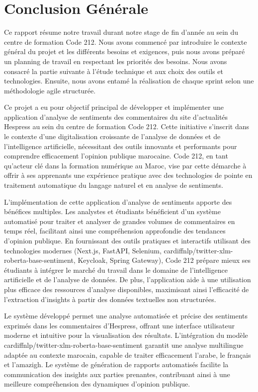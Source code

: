 \chapter*{Conclusion Générale}

Ce rapport résume notre travail durant notre stage de fin d'année au sein du centre de formation Code 212. Nous avons commencé par introduire le contexte général du projet et les différents besoins et exigences, puis nous avons préparé un planning de travail en respectant les priorités des besoins. Nous avons consacré la partie suivante à l'étude technique et aux choix des outils et technologies. Ensuite, nous avons entamé la réalisation de chaque sprint selon une méthodologie agile structurée.

Ce projet a eu pour objectif principal de développer et implémenter une application d'analyse de sentiments des commentaires du site d'actualités Hespress au sein du centre de formation Code 212. Cette initiative s'inscrit dans le contexte d'une digitalisation croissante de l'analyse de données et de l'intelligence artificielle, nécessitant des outils innovants et performants pour comprendre efficacement l'opinion publique marocaine. Code 212, en tant qu'acteur clé dans la formation numérique au Maroc, vise par cette démarche à offrir à ses apprenants une expérience pratique avec des technologies de pointe en traitement automatique du langage naturel et en analyse de sentiments.

L'implémentation de cette application d'analyse de sentiments apporte des bénéfices multiples. Les analystes et étudiants bénéficient d'un système automatisé pour traiter et analyser de grandes volumes de commentaires en temps réel, facilitant ainsi une compréhension approfondie des tendances d'opinion publique. En fournissant des outils pratiques et interactifs utilisant des technologies modernes (Next.js, FastAPI, Selenium, cardiffnlp/twitter-xlm-roberta-base-sentiment, Keycloak, Spring Gateway), Code 212 prépare mieux ses étudiants à intégrer le marché du travail dans le domaine de l'intelligence artificielle et de l'analyse de données. De plus, l'application aide à une utilisation plus efficace des ressources d'analyse disponibles, maximisant ainsi l'efficacité de l'extraction d'insights à partir des données textuelles non structurées.

Le système développé permet une analyse automatisée et précise des sentiments exprimés dans les commentaires d'Hespress, offrant une interface utilisateur moderne et intuitive pour la visualisation des résultats. L'intégration du modèle cardiffnlp/twitter-xlm-roberta-base-sentiment garantit une analyse multilingue adaptée au contexte marocain, capable de traiter efficacement l'arabe, le français et l'amazigh. Le système de génération de rapports automatisés facilite la communication des insights aux parties prenantes, contribuant ainsi à une meilleure compréhension des dynamiques d'opinion publique.

